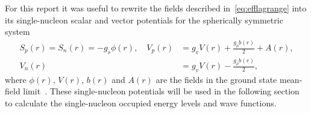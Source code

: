 
For this report it was useful to rewrite the fields described in~\eqref{eq:efflagrange} into its single-nucleon scalar and vector potentials for the spherically symmetric system
\begin{equation}\label{eq:meanpot}
\begin{aligned}
S_p(r) = S_n(r) = -g_s\phi (r),\quad V_p(r) &= g_v V(r)+ \frac{g_{\rho}b(r)}{2} + A(r),\\
V_n(r) &= g_v V(r)- \frac{g_{\rho}b(r)}{2}, 
\end{aligned}
\end{equation}
where $\phi (r)$, $V(r)$, $b(r)$ and $A(r)$ are the fields in the ground state mean-field limit~\cite{todd:2003:relativistic}. These single-nucleon potentials will be used in the following section to calculate the single-nucleon occupied energy levels and wave functions.

